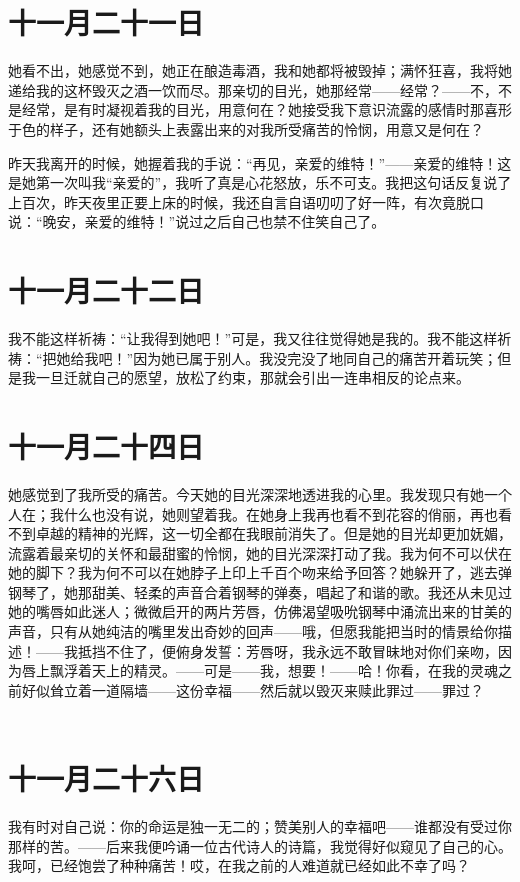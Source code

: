 \documentclass[12pt,oneside]{book}
\begin{document}
\chapter{十一月二十一日}
\label{sec-4-27}
她看不出，她感觉不到，她正在酿造毒酒，我和她都将被毁掉；满怀狂喜，我将她递给我的这杯毁灭之酒一饮而尽。那亲切的目光，她那经常——经常？——不，不是经常，是有时凝视着我的目光，用意何在？她接受我下意识流露的感情时那喜形于色的样子，还有她额头上表露出来的对我所受痛苦的怜悯，用意又是何在？

昨天我离开的时候，她握着我的手说：“再见，亲爱的维特！”——亲爱的维特！这是她第一次叫我“亲爱的”，我听了真是心花怒放，乐不可支。我把这句话反复说了上百次，昨天夜里正要上床的时候，我还自言自语叨叨了好一阵，有次竟脱口说：“晚安，亲爱的维特！”说过之后自己也禁不住笑自己了。
　　

\chapter{十一月二十二日}
\label{sec-4-28}
我不能这样祈祷：“让我得到她吧！”可是，我又往往觉得她是我的。我不能这样祈祷：“把她给我吧！”因为她已属于别人。我没完没了地同自己的痛苦开着玩笑；但是我一旦迁就自己的愿望，放松了约束，那就会引出一连串相反的论点来。
　　

\chapter{十一月二十四日}
\label{sec-4-29}
她感觉到了我所受的痛苦。今天她的目光深深地透进我的心里。我发现只有她一个人在；我什么也没有说，她则望着我。在她身上我再也看不到花容的俏丽，再也看不到卓越的精神的光辉，这一切全都在我眼前消失了。但是她的目光却更加妩媚，流露着最亲切的关怀和最甜蜜的怜悯，她的目光深深打动了我。我为何不可以伏在她的脚下？我为何不可以在她脖子上印上千百个吻来给予回答？她躲开了，逃去弹钢琴了，她那甜美、轻柔的声音合着钢琴的弹奏，唱起了和谐的歌。我还从未见过她的嘴唇如此迷人；微微启开的两片芳唇，仿佛渴望吸吮钢琴中涌流出来的甘美的声音，只有从她纯洁的嘴里发出奇妙的回声——哦，但愿我能把当时的情景给你描述！——我抵挡不住了，便俯身发誓：芳唇呀，我永远不敢冒昧地对你们亲吻，因为唇上飘浮着天上的精灵。——可是——我，想要！——哈！你看，在我的灵魂之前好似耸立着一道隔墙——这份幸福——然后就以毁灭来赎此罪过——罪过？
　　

\chapter{十一月二十六日}
\label{sec-4-30}
我有时对自己说：你的命运是独一无二的；赞美别人的幸福吧——谁都没有受过你那样的苦。——后来我便吟诵一位古代诗人的诗篇，我觉得好似窥见了自己的心。我呵，已经饱尝了种种痛苦！哎，在我之前的人难道就已经如此不幸了吗？
　　
\end{document}

